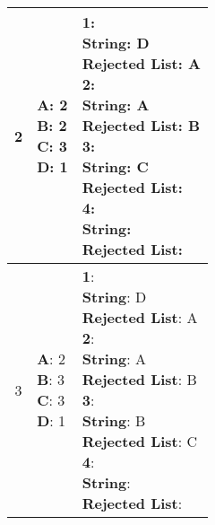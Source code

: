 \documentclass{article}
\begin{document}
\begin{center}
\begin{longtable}{ c|l|l }
        2 & \makecell{\textbf{A}: 2 \\ \textbf{B}: 2 \\ \textbf{C}: 3 \\ \textbf{D}: 1} &  
        \makecell{\textbf{1}:\\ \hspace{10mm} \textbf{String}: D \\ \hspace{10mm} \textbf{Rejected List}: A \\
                    \textbf{2}:\\ \hspace{10mm} \textbf{String}: A \\ \hspace{10mm} \textbf{Rejected List}: B \\
                    \textbf{3}:\\ \hspace{10mm} \textbf{String}: C \\ \hspace{10mm} \textbf{Rejected List}: \\
                    \textbf{4}:\\ \hspace{10mm} \textbf{String}:  \\ \hspace{10mm} \textbf{Rejected List}: \\} \\
        \hline 

        3 & \makecell{\textbf{A}: 2 \\ \textbf{B}: 3 \\ \textbf{C}: 3 \\ \textbf{D}: 1} &  
        \makecell{\textbf{1}:\\ \hspace{10mm} \textbf{String}: D \\ \hspace{10mm} \textbf{Rejected List}: A \\
                    \textbf{2}:\\ \hspace{10mm} \textbf{String}: A \\ \hspace{10mm} \textbf{Rejected List}: B \\
                    \textbf{3}:\\ \hspace{10mm} \textbf{String}: B \\ \hspace{10mm} \textbf{Rejected List}: C\\
                    \textbf{4}:\\ \hspace{10mm} \textbf{String}:  \\ \hspace{10mm} \textbf{Rejected List}: \\} \\
        \hline 


\end{longtable}
\end{center}
\end{document}
